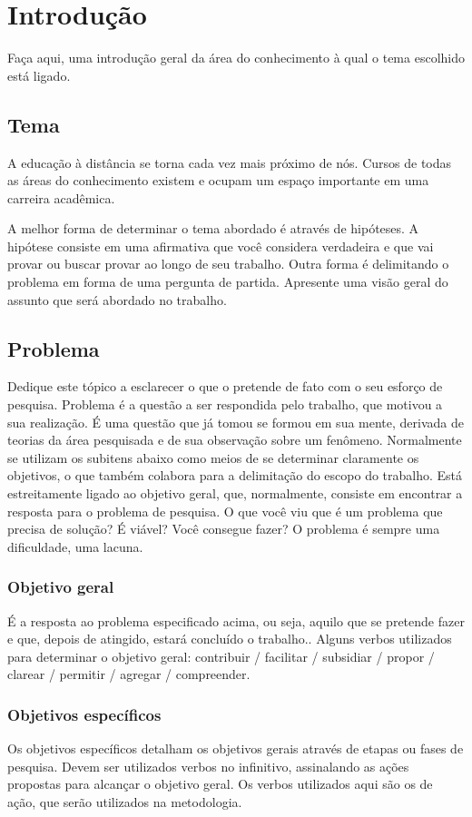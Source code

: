 \chapter{Introdução}
Faça aqui, uma introdução geral da área do conhecimento à qual o tema escolhido
está ligado. 

\section{Tema}
A educação à distância se torna cada vez mais próximo de nós. Cursos de todas as áreas do conhecimento existem e ocupam um espaço importante em uma carreira acadêmica.

A melhor forma de determinar o tema abordado é através de hipóteses. A hipótese
consiste em uma afirmativa que você considera verdadeira e que vai provar ou
buscar provar ao longo de seu trabalho. Outra forma é delimitando o problema em
forma de uma pergunta de partida. Apresente uma visão geral do assunto que será
abordado no trabalho.

\section{Problema}
Dedique este tópico a esclarecer o que o pretende de fato com o seu esforço de
pesquisa. Problema é a questão a ser respondida pelo trabalho, que motivou a sua
realização. É uma questão que já tomou se formou em sua mente, derivada de
teorias da área pesquisada e de sua observação sobre um fenômeno.  Normalmente
se utilizam os subitens abaixo como meios de se determinar claramente os
objetivos, o que também colabora para a delimitação do escopo do trabalho. Está
estreitamente ligado ao objetivo geral, que, normalmente, consiste em encontrar
a resposta para o problema de pesquisa.  O que você viu que é um problema que
precisa de solução? É viável? Você consegue fazer? O problema é sempre uma
dificuldade, uma lacuna.

\subsection{Objetivo geral}
É a resposta ao problema especificado acima, ou seja, aquilo que se pretende
fazer e que, depois de atingido, estará concluído o trabalho.. Alguns verbos
utilizados para determinar o objetivo geral: contribuir / facilitar / subsidiar
/ propor / clarear / permitir / agregar / compreender.

\subsection{Objetivos específicos}
Os objetivos específicos detalham os objetivos gerais através de etapas ou fases
de pesquisa. Devem ser utilizados verbos no infinitivo, assinalando as ações
propostas para alcançar o objetivo geral. Os verbos utilizados aqui são os de
ação, que serão utilizados na metodologia.


